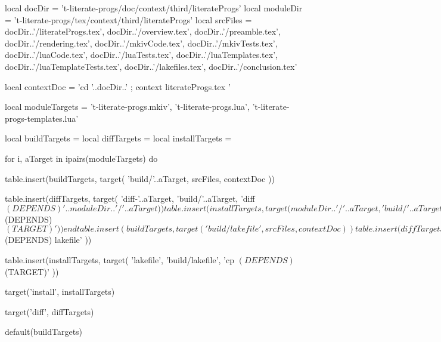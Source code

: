 local docDir    =
  't-literate-progs/doc/context/third/literateProgs'
local moduleDir =
  't-literate-progs/tex/context/third/literateProgs'
local srcFiles = {
  docDir..'/literateProgs.tex',
  docDir..'/overview.tex',
  docDir..'/preamble.tex',
  docDir..'/rendering.tex',
  docDir..'/mkivCode.tex',
  docDir..'/mkivTests.tex',
  docDir..'/luaCode.tex',
  docDir..'/luaTests.tex',
  docDir..'/luaTemplates.tex',
  docDir..'/luaTemplateTests.tex',
  docDir..'/lakefiles.tex',
  docDir..'/conclusion.tex'
}

local contextDoc = 
  'cd '..docDir..' ; context literateProgs.tex '

local moduleTargets = {
  't-literate-progs.mkiv',
  't-literate-progs.lua',
  't-literate-progs-templates.lua'
}

local buildTargets   = { }
local diffTargets    = { }
local installTargets = { }

for i, aTarget in ipairs(moduleTargets) do

  table.insert(buildTargets, target(
    'build/'..aTarget,
    srcFiles,
    contextDoc
  ))

  table.insert(diffTargets, target(
    'diff-'..aTarget,
    'build/'..aTarget,
    'diff $(DEPENDS) '..moduleDir..'/'..aTarget
  ))

  table.insert(installTargets, target(
    moduleDir..'/'..aTarget,
    'build/'..aTarget,
    'cp $(DEPENDS) $(TARGET)'
  ))
end

table.insert(buildTargets, target(
  'build/lakefile',
  srcFiles,
  contextDoc
))

table.insert(diffTargets, target(
  'diff-lakefile',
  'build/lakefile',
  'diff $(DEPENDS) lakefile'
))

table.insert(installTargets, target(
  'lakefile',
  'build/lakefile',
  'cp $(DEPENDS) $(TARGET)'
))

target('install', installTargets)

target('diff', diffTargets)

default(buildTargets)

\stopLakefile

\stopchapter
